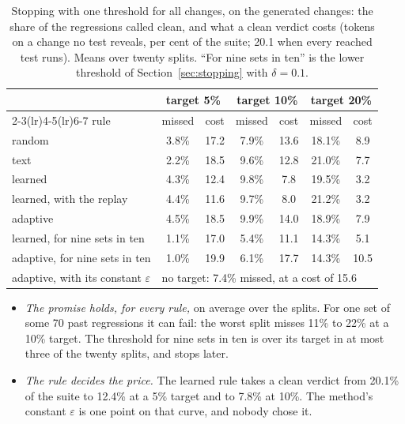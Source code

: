 \documentclass[11pt,a4paper]{article}
\begin{document}
\begin{table}[H]
\centering\small
\caption{Stopping with one threshold for all changes, on the generated changes: the share of the regressions
called clean, and what a clean verdict costs (tokens on a change no test reveals, per cent of the suite; 20.1
when every reached test runs). Means over twenty splits. ``For nine sets in ten'' is the lower threshold of
Section~\ref{sec:stopping} with $\delta = 0.1$.}
\label{tab:stopping}
\begin{tabular}{lcccccc}
\toprule
 & \multicolumn{2}{c}{target 5\%} & \multicolumn{2}{c}{target 10\%} & \multicolumn{2}{c}{target 20\%} \\
\cmidrule(lr){2-3}\cmidrule(lr){4-5}\cmidrule(lr){6-7}
rule & missed & cost & missed & cost & missed & cost \\
\midrule
random & 3.8\% & 17.2 & 7.9\% & 13.6 & 18.1\% & 8.9 \\
text & 2.2\% & 18.5 & 9.6\% & 12.8 & 21.0\% & 7.7 \\
learned & 4.3\% & 12.4 & 9.8\% & 7.8 & 19.5\% & 3.2 \\
learned, with the replay & 4.4\% & 11.6 & 9.7\% & 8.0 & 21.2\% & 3.2 \\
adaptive & 4.5\% & 18.5 & 9.9\% & 14.0 & 18.9\% & 7.9 \\
\midrule
learned, for nine sets in ten & 1.1\% & 17.0 & 5.4\% & 11.1 & 14.3\% & 5.1 \\
adaptive, for nine sets in ten & 1.0\% & 19.9 & 6.1\% & 17.7 & 14.3\% & 10.5 \\
\midrule
adaptive, with its constant $\varepsilon$ & \multicolumn{6}{l}{no target: 7.4\% missed, at a cost of 15.6} \\
\bottomrule
\end{tabular}
\end{table}

\begin{itemize}
  \item \emph{The promise holds, for every rule,} on average over the splits. For one set of some 70 past
        regressions it can fail: the worst split misses 11\% to 22\% at a 10\% target. The threshold for nine sets
        in ten is over its target in at most three of the twenty splits, and stops later.
  \item \emph{The rule decides the price.} The learned rule takes a clean verdict from 20.1\% of the suite to
        12.4\% at a 5\% target and to 7.8\% at 10\%. The method's constant $\varepsilon$ is one point on that
        curve, and nobody chose it.
\end{itemize}
\end{document}
